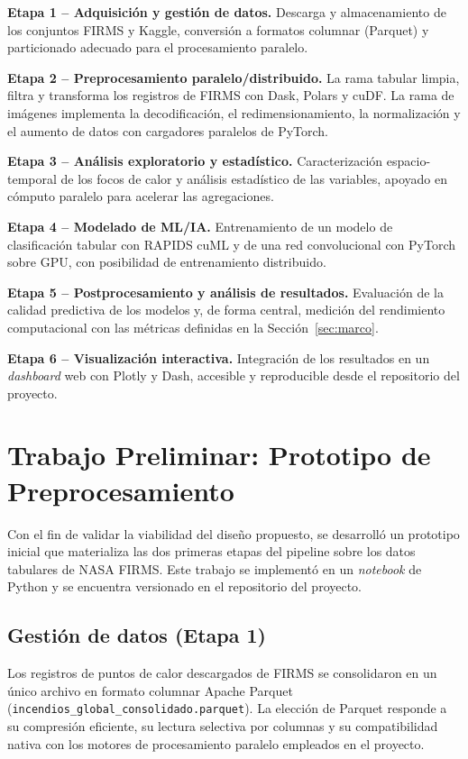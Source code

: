 \textbf{Etapa 1 -- Adquisición y gestión de datos.} Descarga y almacenamiento de los conjuntos FIRMS y Kaggle, conversión a formatos columnar (Parquet) y particionado adecuado para el procesamiento paralelo.

\textbf{Etapa 2 -- Preprocesamiento paralelo/distribuido.} La rama tabular limpia, filtra y transforma los registros de FIRMS con Dask, Polars y cuDF. La rama de imágenes implementa la decodificación, el redimensionamiento, la normalización y el aumento de datos con cargadores paralelos de PyTorch.

\textbf{Etapa 3 -- Análisis exploratorio y estadístico.} Caracterización espacio-temporal de los focos de calor y análisis estadístico de las variables, apoyado en cómputo paralelo para acelerar las agregaciones.

\textbf{Etapa 4 -- Modelado de ML/IA.} Entrenamiento de un modelo de clasificación tabular con RAPIDS cuML y de una red convolucional con PyTorch sobre GPU, con posibilidad de entrenamiento distribuido.

\textbf{Etapa 5 -- Postprocesamiento y análisis de resultados.} Evaluación de la calidad predictiva de los modelos y, de forma central, medición del rendimiento computacional con las métricas definidas en la Sección~\ref{sec:marco}.

\textbf{Etapa 6 -- Visualización interactiva.} Integración de los resultados en un \textit{dashboard} web con Plotly y Dash, accesible y reproducible desde el repositorio del proyecto.

\section{Trabajo Preliminar: Prototipo de Preprocesamiento}
\label{sec:prototipo}

Con el fin de validar la viabilidad del diseño propuesto, se desarrolló un prototipo inicial que materializa las dos primeras etapas del pipeline sobre los datos tabulares de NASA FIRMS. Este trabajo se implementó en un \textit{notebook} de Python y se encuentra versionado en el repositorio del proyecto.

\subsection{Gestión de datos (Etapa 1)}
Los registros de puntos de calor descargados de FIRMS se consolidaron en un único archivo en formato columnar Apache Parquet (\texttt{incendios\_global\_consolidado.parquet}). La elección de Parquet responde a su compresión eficiente, su lectura selectiva por columnas y su compatibilidad nativa con los motores de procesamiento paralelo empleados en el proyecto.


